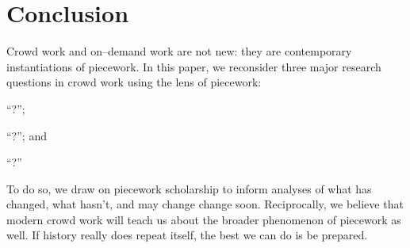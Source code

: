 \documentclass[trackingWork]{subfiles}
\begin{document}
\section{Conclusion}
Crowd work and on--demand work are not new: they are contemporary instantiations of piecework.
In this paper, we reconsider three major research questions in crowd work using the lens of piecework:
\begin{inlinelist}
  \item ``?'';
  \item ``?''; and
  \item ``?''
\end{inlinelist}
To do so, we draw on piecework scholarship to inform analyses of what has changed, what hasn't, and may change change soon.
Reciprocally, we believe that modern crowd work will teach us about the broader phenomenon of piecework as well.
If history really does repeat itself, the best we can do is be prepared.
\end{document}
